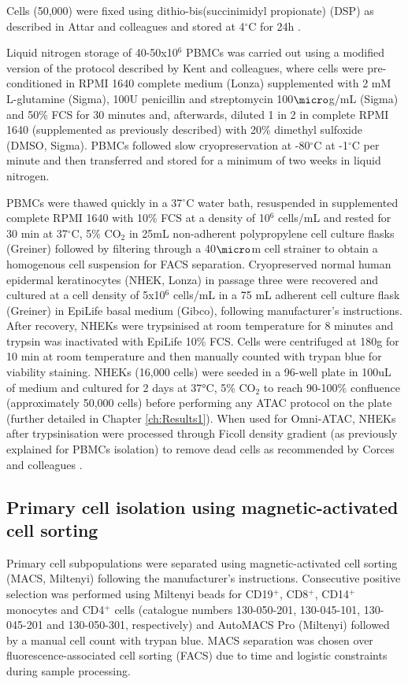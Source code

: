 Cells (50,000) were fixed using dithio-bis(succinimidyl propionate) (DSP) as described in Attar and colleagues and stored at 4{$^\circ$}C for 24h \parencite{Attar2018}.

Liquid nitrogen storage of 40-50x10$^6$ PBMCs was carried out using a modified version of the  protocol described by Kent and colleagues\parencite{Kent2009}, where cells were pre-conditioned in RPMI 1640 complete medium (Lonza) supplemented with 2 mM L-glutamine (Sigma), 100U penicillin and streptomycin 100$\micro$g/mL (Sigma) and 50\% FCS for 30 minutes and, afterwards, diluted 1 in 2 in complete RPMI 1640 (supplemented as previously described) with 20\% dimethyl sulfoxide (DMSO, Sigma). PBMCs followed slow cryopreservation at -80{$^\circ$}C at -1{$^\circ$}C per minute and then transferred and stored for a minimum of two weeks in liquid nitrogen. 

PBMCs were thawed quickly in a 37{$^\circ$}C water bath, resuspended in supplemented complete RPMI 1640 with 10\% FCS at a density of 10$^6$ cells/mL and rested for 30 min at 37{$^\circ$}C, 5\% CO$_2$ in 25mL non-adherent polypropylene cell culture flasks (Greiner) followed by filtering through a 40$\micro$m cell strainer to obtain a homogenous cell suspension for FACS separation.
Cryopreserved normal human epidermal keratinocytes (NHEK, Lonza) in passage three were recovered and cultured at a cell density of 5x10$^6$ cells/mL in a 75 mL adherent cell culture flask (Greiner) in EpiLife basal medium (Gibco), following manufacturer's instructions. After recovery, NHEKs were trypsinised at room temperature for 8 minutes and trypsin was inactivated with EpiLife 10\% FCS. Cells were centrifuged at 180g for 10 min at room temperature and then manually counted with trypan blue for viability staining. NHEKs (16,000 cells) were seeded in a 96-well plate in 100uL of medium and cultured for 2 days at 37°C, 5\% CO$_2$ to reach 90-100\% confluence (approximately 50,000 cells) before performing any ATAC protocol on the plate (further detailed in Chapter \ref{ch:Results1}). When used for Omni-ATAC, NHEKs after trypsinisation were processed through Ficoll density gradient (as previously explained for PBMCs isolation) to remove dead cells as recommended by Corces and colleagues \parencite{Corces2017}.




\subsection{Primary cell isolation using magnetic-activated cell sorting}
Primary cell subpopulations were separated using magnetic-activated cell sorting (MACS, Miltenyi) following the manufacturer's instructions. Consecutive positive selection was performed using Miltenyi beads for CD19$^+$, CD8$^+$, CD14$^+$ monocytes and CD4$^+$ cells (catalogue numbers 130-050-201, 130-045-101, 130-045-201 and 130-050-301, respectively) and AutoMACS Pro (Miltenyi) followed by a manual cell count with trypan blue. MACS separation was chosen over fluorescence-associated cell sorting (FACS) due to time and logistic constraints during sample processing.


